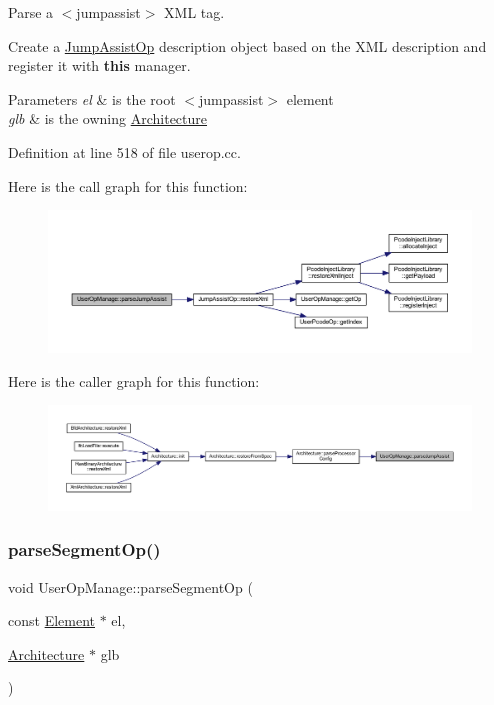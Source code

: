 Parse a $<$jumpassist$>$ X\+ML tag. 

Create a \mbox{\hyperlink{class_jump_assist_op}{Jump\+Assist\+Op}} description object based on the X\+ML description and register it with {\bfseries{this}} manager. 
\begin{DoxyParams}{Parameters}
{\em el} & is the root $<$jumpassist$>$ element \\
\hline
{\em glb} & is the owning \mbox{\hyperlink{class_architecture}{Architecture}} \\
\hline
\end{DoxyParams}


Definition at line 518 of file userop.\+cc.

Here is the call graph for this function\+:
\nopagebreak
\begin{figure}[H]
\begin{center}
\leavevmode
\includegraphics[width=350pt]{class_user_op_manage_ad51fcfacc1f75bb23dcad875eda155f9_cgraph}
\end{center}
\end{figure}
Here is the caller graph for this function\+:
\nopagebreak
\begin{figure}[H]
\begin{center}
\leavevmode
\includegraphics[width=350pt]{class_user_op_manage_ad51fcfacc1f75bb23dcad875eda155f9_icgraph}
\end{center}
\end{figure}
\mbox{\label{class_user_op_manage_ab6ce4b3d4fb3046930b47b1e94c2131d}} 
\subsubsection{\texorpdfstring{parseSegmentOp()}{parseSegmentOp()}}
{\footnotesize\ttfamily void User\+Op\+Manage\+::parse\+Segment\+Op (\begin{DoxyParamCaption}\item[{const \mbox{\hyperlink{class_element}{Element}} $\ast$}]{el,  }\item[{\mbox{\hyperlink{class_architecture}{Architecture}} $\ast$}]{glb }\end{DoxyParamCaption})}



